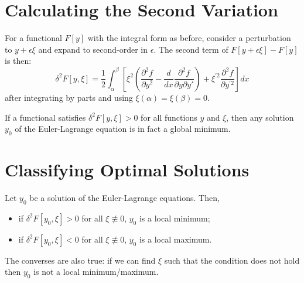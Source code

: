 \documentclass[../Main.tex]{subfiles}
\begin{document}
\section{Calculating the Second Variation}
For a functional $F[y]$ with the integral form as before, consider a perturbation to $y + \epsilon \xi$ and expand to second-order in $\epsilon$. The second term of $F[y + \epsilon\xi] - F[y]$ is then:
\begin{equation*}
    \delta^2 F[y, \xi] = \frac12 \int_{\alpha}^{\beta} \left[\xi^2 \left(\frac{\partial^{2}f}{\partial y^{2}} - \frac{d}{dx}\frac{\partial^{2}f}{\partial y\partial y'}\right) + \xi^{\prime 2} \frac{\partial^{2}f}{\partial y^{\prime 2}}\right] dx 
\end{equation*}
after integrating by parts and using $\xi(\alpha) = \xi(\beta) = 0$.
\begin{theorem}
    If a functional satisfies $\delta^2 F[y,\xi] > 0$ for all functions $y$ and $\xi$, then any solution $y_0$ of the Euler-Lagrange equation is in fact a global minimum.
    \label{thmGlobalMin}
\end{theorem}
\section{Classifying Optimal Solutions}
Let $y_0$ be a solution of the Euler-Lagrange equations. Then,
\begin{itemize}
    \item if $\delta^2 F[y_0, \xi] > 0$ for all $\xi \not\equiv 0$, $y_0$ is a local minimum;
    \item if $\delta^2 F[y_0, \xi] < 0$ for all $\xi \not\equiv 0$, $y_0$ is a local maximum.
\end{itemize}
The converses are also true: if we can find $\xi$ such that the condition does not hold then $y_0$ is not a local minimum/maximum.
\end{document}
